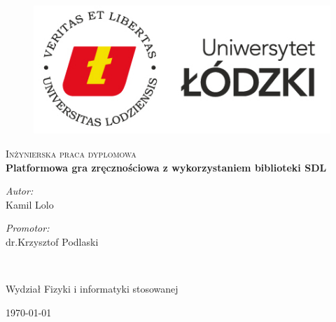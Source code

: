 \documentclass[12pt, a4paper, oneside]{Thesis} %
\begin{document}
\begin{titlepage}
\begin{center}

\begin{figure}
    \centering
    \includegraphics[width=\linewidth]{./Pictures/logo.jpg}
\end{figure}

\textsc{\Large Inżynierska praca dyplomowa \newline }\\[0.5cm] 


{\huge \bfseries Platformowa gra zręcznościowa z wykorzystaniem biblioteki SDL }\\[0.4cm] %

\addvspace{110pt}
 
\begin{minipage}{0.4\textwidth}
\begin{flushleft} \large
\emph{Autor:}\\
Kamil Lolo 
\end{flushleft}
\end{minipage}
\begin{minipage}{0.4\textwidth}
\begin{flushright} \large
\emph{Promotor:} \\
dr.Krzysztof Podlaski
\end{flushright}
\end{minipage}\\[3cm]


\vfill
\addvspace{20pt}
\begin{center}
Wydział Fizyki i informatyki stosowanej
\end{center}
{\large \today}\\[4cm] %


\end{center}
\end{titlepage}

\end{document}
